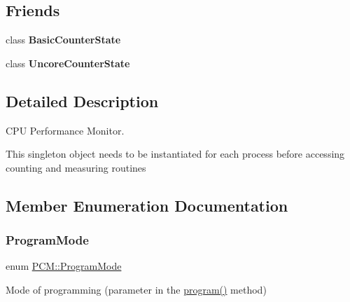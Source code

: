 \subsection*{Friends}
\begin{DoxyCompactItemize}
\item 
\mbox{\label{class_p_c_m_ae338fe587ce44ca6801b2f280dd87b25}} 
class {\bfseries Basic\+Counter\+State}
\item 
\mbox{\label{class_p_c_m_a50a2644b6d84c756de9746c1cf1ed68e}} 
class {\bfseries Uncore\+Counter\+State}
\end{DoxyCompactItemize}


\subsection{Detailed Description}
C\+PU Performance Monitor. 

This singleton object needs to be instantiated for each process before accessing counting and measuring routines 

\subsection{Member Enumeration Documentation}
\mbox{\label{class_p_c_m_a88584813a3ef51376efeb22928764786}} 
\subsubsection{\texorpdfstring{Program\+Mode}{ProgramMode}}
{\footnotesize\ttfamily enum \mbox{\hyperlink{class_p_c_m_a88584813a3ef51376efeb22928764786}{P\+C\+M\+::\+Program\+Mode}}}



Mode of programming (parameter in the \mbox{\hyperlink{class_p_c_m_abae9577a1a172c944d133bef10683825}{program()}} method) 


